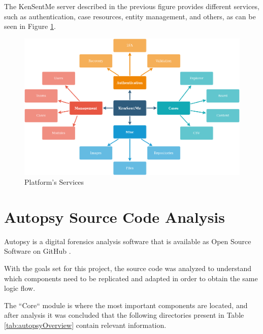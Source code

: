 The KenSentMe server described in the previous figure provides different services, such as authentication, case resources, entity management, and others, as can be seen in Figure \ref{fig:services}.

\begin{figure}[ht]
 \centering
 \includegraphics[width=1\linewidth]{imgs/services.png}
 \caption{Platform's Services}
 \label{fig:services}
\end{figure}

\section{Autopsy Source Code Analysis}

Autopsy is a digital forensics analysis software that is available as Open Source Software \cite{opensource} on GitHub \cite{github}.

With the goals set for this project, the source code was analyzed to understand which components need to be replicated and adapted in order to obtain the same logic flow.

The ``Core`` module is where the most important components are located, and after analysis it was concluded that the following directories present in Table \ref{tab:autopsyOverview} contain relevant information.


\pagebreak

